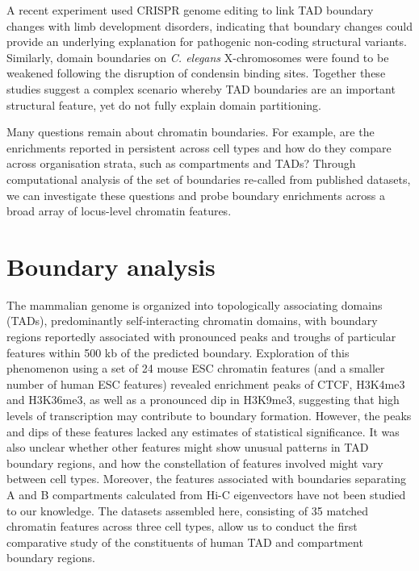 \documentclass[a4paper,11pt,oneside]{book}
\begin{document}
A recent experiment used CRISPR genome editing to link TAD boundary changes with limb development disorders,\cite{Lupianez2015} indicating that boundary changes could provide an underlying explanation for pathogenic non-coding structural variants.\cite{Ren2015} Similarly, domain boundaries on \emph{C. elegans} X-chromosomes were found to be weakened following the disruption of condensin binding sites.\cite{Crane2015} Together these studies suggest a complex scenario whereby TAD boundaries are an important structural feature, yet do not fully explain domain partitioning.


Many questions remain about chromatin boundaries. For example, are the enrichments reported in \citet{Dixon2012} persistent across cell types and how do they compare across organisation strata, such as compartments and TADs? Through computational analysis of the set of boundaries re-called from published datasets, we can investigate these questions and probe boundary enrichments across a broad array of locus-level chromatin features.

\section{Boundary analysis}\label{sec:boundaryenrichments}

The mammalian genome is organized into topologically associating domains (TADs), predominantly self-interacting chromatin domains, with boundary regions reportedly associated with pronounced peaks and troughs of particular features within 500 kb of the predicted boundary.\cite{Dixon2012} Exploration of this phenomenon using a set of 24 mouse ESC chromatin features (and a smaller number of human ESC features) revealed enrichment peaks of CTCF, H3K4me3 and H3K36me3, as well as a pronounced dip in H3K9me3, suggesting that high levels of transcription may contribute to boundary formation.\cite{Dixon2012} However, the peaks and dips of these features lacked any estimates of statistical significance. It was also unclear whether other features might show unusual patterns in TAD boundary regions, and how the constellation of features involved might vary between cell types. Moreover, the features associated with boundaries separating A and B compartments calculated from Hi-C eigenvectors have not been studied to our knowledge. The datasets assembled here, consisting of 35 matched chromatin features across three cell types, allow us to conduct the first comparative study of the constituents of human TAD and compartment boundary regions.
\end{document}
